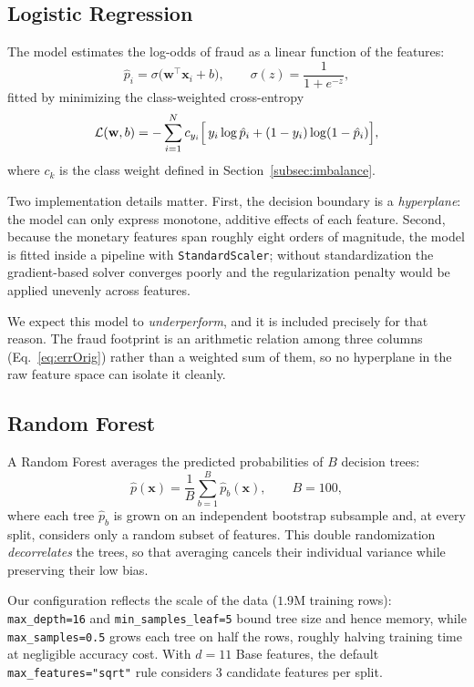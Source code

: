 \documentclass{article}
\begin{document}
\subsection{Logistic Regression}
The model estimates the log-odds of fraud as a linear function of the
features:
\begin{equation}
\hat p_i = \sigma\bigl(\mathbf{w}^{\!\top}\mathbf{x}_i + b\bigr),
\qquad
\sigma(z) = \frac{1}{1 + e^{-z}},
\label{eq:logreg}
\end{equation}
fitted by minimizing the class-weighted cross-entropy
\begin{equation}
\mathcal{L}(\mathbf{w}, b) = -\sum_{i=1}^{N} c_{y_i}
\Bigl[\, y_i \log \hat p_i + (1 - y_i)\log(1 - \hat p_i) \Bigr],
\label{eq:ce}
\end{equation}
where $c_k$ is the class weight defined in
Section~\ref{subsec:imbalance}.

Two implementation details matter. First, the decision boundary is a
\emph{hyperplane}: the model can only express monotone, additive
effects of each feature. Second, because the monetary features span
roughly eight orders of magnitude, the model is fitted inside a
pipeline with \texttt{StandardScaler}; without standardization the
gradient-based solver converges poorly and the regularization penalty
would be applied unevenly across features.

We expect this model to \emph{underperform}, and it is included
precisely for that reason. The fraud footprint is an arithmetic
relation among three columns (Eq.~\ref{eq:errOrig}) rather than a
weighted sum of them, so no hyperplane in the raw feature space can
isolate it cleanly.

\subsection{Random Forest}
A Random Forest averages the predicted probabilities of $B$ decision
trees:
\begin{equation}
\hat p(\mathbf{x}) = \frac{1}{B}\sum_{b=1}^{B} \hat p_b(\mathbf{x}),
\qquad B = 100,
\label{eq:rf}
\end{equation}
where each tree $\hat p_b$ is grown on an independent bootstrap
subsample and, at every split, considers only a random subset of
features. This double randomization \emph{decorrelates} the trees, so
that averaging cancels their individual variance while preserving their
low bias.

Our configuration reflects the scale of the data
($1.9$M training rows): \texttt{max\_depth=16} and
\texttt{min\_samples\_leaf=5} bound tree size and hence memory, while
\texttt{max\_samples=0.5} grows each tree on half the rows, roughly
halving training time at negligible accuracy cost. With $d = 11$ Base
features, the default \texttt{max\_features="sqrt"} rule considers $3$
candidate features per split.
\end{document}
